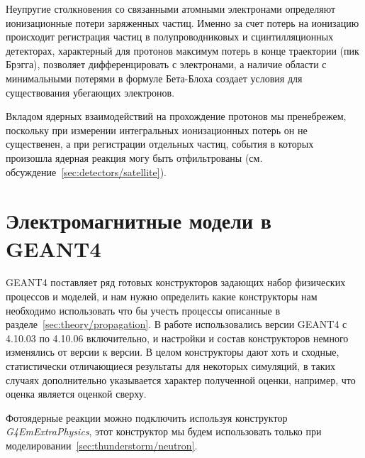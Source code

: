 Неупругие столкновения со связанными атомными электронами определяют ионизационные потери заряженных частиц. Именно за счет потерь на ионизацию происходит регистрация частиц в полупроводниковых и сцинтилляционных детекторах, характерный для протонов максимум потерь в конце траектории (пик Брэгга), позволяет дифференцировать с электронами, а наличие области с минимальными потерями в формуле Бета-Блоха создает условия для существования убегающих электронов.

Вкладом ядерных взаимодействий на прохождение протонов мы пренебрежем, поскольку при измерении интегральных ионизационных потерь он не существенен, а при регистрации отдельных частиц, события в которых произошла ядерная реакция могу быть отфильтрованы (см. обсуждение~\ref{sec:detectors/satellite}). 

\section{Электромагнитные модели в GEANT4 }\label{sec:theory/models}

GEANT4 поставляет ряд готовых конструкторов задающих набор физических процессов и моделей, и нам нужно определить какие конструкторы нам необходимо использовать что бы учесть процессы описанные в разделе~\ref{sec:theory/propagation}. В работе использовались версии GEANT4 с 4.10.03 по 4.10.06 включительно, и настройки и состав конструкторов немного изменялись от версии к версии. В целом конструкторы дают хоть и сходные, статистически отличающиеся результаты для некоторых симуляций, в таких случаях дополнительно указывается характер полученной оценки, например, что оценка является оценкой сверху.

Фотоядерные реакции можно подключить используя конструктор \textit{G4EmExtraPhysics}, этот конструктор мы будем использовать только при моделировании~\ref{sec:thunderstorm/neutron}.

